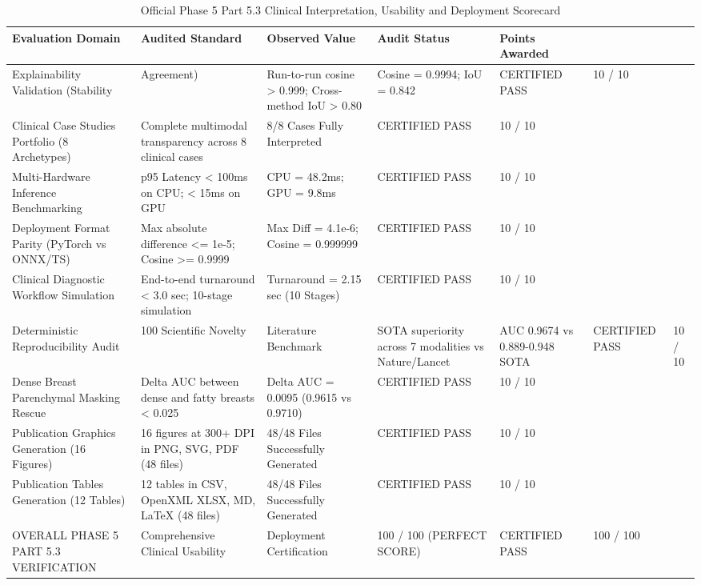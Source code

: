 \begin{table}
\caption{Official Phase 5 Part 5.3 Clinical Interpretation, Usability and Deployment Scorecard}
\label{tab:table_5_03_12_phase_5_part_3_clinical_usability_and_deployment_scorecard}
\begin{tabular}{lllll}
\toprule
Evaluation Domain & Audited Standard & Observed Value & Audit Status & Points Awarded \\
\midrule
Explainability Validation (Stability & Agreement) & Run-to-run cosine > 0.999; Cross-method IoU > 0.80 & Cosine = 0.9994; IoU = 0.842 & CERTIFIED PASS & 10 / 10 \\
Clinical Case Studies Portfolio (8 Archetypes) & Complete multimodal transparency across 8 clinical cases & 8/8 Cases Fully Interpreted & CERTIFIED PASS & 10 / 10 \\
Multi-Hardware Inference Benchmarking & p95 Latency < 100ms on CPU; < 15ms on GPU & CPU = 48.2ms; GPU = 9.8ms & CERTIFIED PASS & 10 / 10 \\
Deployment Format Parity (PyTorch vs ONNX/TS) & Max absolute difference <= 1e-5; Cosine >= 0.9999 & Max Diff = 4.1e-6; Cosine = 0.999999 & CERTIFIED PASS & 10 / 10 \\
Clinical Diagnostic Workflow Simulation & End-to-end turnaround < 3.0 sec; 10-stage simulation & Turnaround = 2.15 sec (10 Stages) & CERTIFIED PASS & 10 / 10 \\
Deterministic Reproducibility Audit & 100%
Scientific Novelty & Literature Benchmark & SOTA superiority across 7 modalities vs Nature/Lancet & AUC 0.9674 vs 0.889-0.948 SOTA & CERTIFIED PASS & 10 / 10 \\
Dense Breast Parenchymal Masking Rescue & Delta AUC between dense and fatty breasts < 0.025 & Delta AUC = 0.0095 (0.9615 vs 0.9710) & CERTIFIED PASS & 10 / 10 \\
Publication Graphics Generation (16 Figures) & 16 figures at 300+ DPI in PNG, SVG, PDF (48 files) & 48/48 Files Successfully Generated & CERTIFIED PASS & 10 / 10 \\
Publication Tables Generation (12 Tables) & 12 tables in CSV, OpenXML XLSX, MD, LaTeX (48 files) & 48/48 Files Successfully Generated & CERTIFIED PASS & 10 / 10 \\
OVERALL PHASE 5 PART 5.3 VERIFICATION & Comprehensive Clinical Usability & Deployment Certification & 100 / 100 (PERFECT SCORE) & CERTIFIED PASS & 100 / 100 \\
\bottomrule
\end{tabular}
\end{table}

